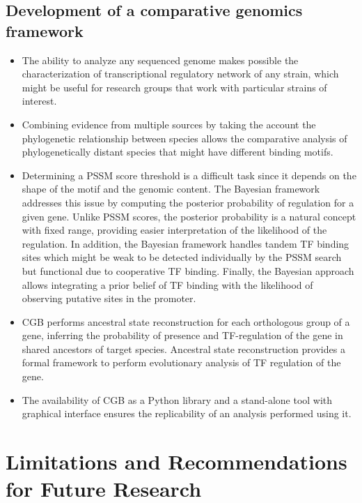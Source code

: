 \documentclass[12pt]{article}
\begin{document}
\subsection{Development of a comparative genomics framework}

\begin{itemize}

\item The ability to analyze any sequenced genome makes possible the
  characterization of transcriptional regulatory network of any strain, which
  might be useful for research groups that work with particular strains of
  interest.

\item Combining evidence from multiple sources by taking the account the
  phylogenetic relationship between species allows the comparative analysis of
  phylogenetically distant species that might have different binding motifs.

\item Determining a PSSM score threshold is a difficult task since it depends
  on the shape of the motif and the genomic content. The Bayesian framework
  addresses this issue by computing the posterior probability of regulation for
  a given gene. Unlike PSSM scores, the posterior probability is a natural
  concept with fixed range, providing easier interpretation of the likelihood
  of the regulation. In addition, the Bayesian framework handles tandem TF
  binding sites which might be weak to be detected individually by the PSSM
  search but functional due to cooperative TF binding. Finally, the Bayesian
  approach allows integrating a prior belief of TF binding with the likelihood
  of observing putative sites in the promoter.

\item CGB performs ancestral state reconstruction for each orthologous group of
  a gene, inferring the probability of presence and TF-regulation of the gene
  in shared ancestors of target species. Ancestral state reconstruction
  provides a formal framework to perform evolutionary analysis of TF regulation
  of the gene.

\item The availability of CGB as a Python library and a stand-alone tool with
  graphical interface ensures the replicability of an analysis performed using
  it.
\end{itemize}

\section{Limitations and Recommendations for Future Research}
\end{document}
